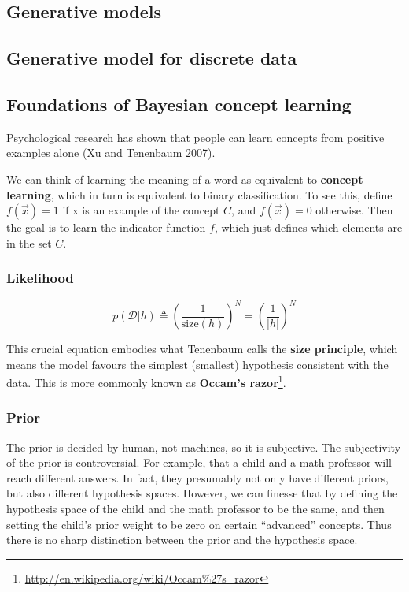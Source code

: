 \begin{refsection}
\startcontents[chapters]
	\chapter{Generative models}\label{ch:statistical-learning:sec:GenerativeModels}

\section{Generative model for discrete data}

\section{Foundations of Bayesian concept learning}
Psychological research has shown that people can learn concepts from positive examples alone (Xu and Tenenbaum 2007).

We can think of learning the meaning of a word as equivalent to \textbf{concept learning}, which in turn is equivalent to binary classification. To see this, define $f(\vec{x})=1$ if x is an example of the concept $C$, and $f(\vec{x})=0$ otherwise. Then the goal is to learn the indicator function $f$, which just defines which elements are in the set $C$.


\subsection{Likelihood}
\begin{equation}
p(\mathcal{D}|h) \triangleq \left(\dfrac{1}{\text{size}(h)}\right)^N=\left(\dfrac{1}{|h|}\right)^N
\end{equation}

This crucial equation embodies what Tenenbaum calls the \textbf{size principle}, which means the model favours the simplest (smallest) hypothesis consistent with the data. This is more commonly known as \textbf{Occam’s razor}\footnote{\url{http://en.wikipedia.org/wiki/Occam\%27s_razor}}.


\subsection{Prior}
The prior is decided by human, not machines, so it is subjective. The subjectivity of the prior is controversial. For example, that a child and a math professor will reach different answers. In fact, they presumably not only have different priors, but also different hypothesis spaces. However, we can finesse that by defining the hypothesis space of the child and the math professor to be the same, and then setting the child’s prior weight to be zero on certain “advanced” concepts. Thus there is no sharp distinction between the prior and the hypothesis space.


\end{refsection}

